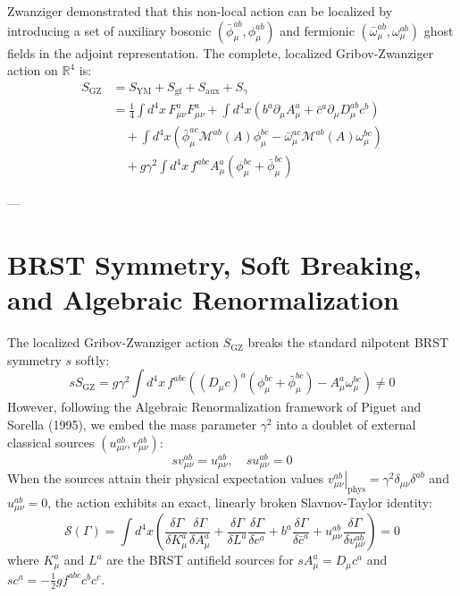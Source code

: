 \documentclass[11pt,a4paper]{article}
\theoremstyle{definition}
\begin{document}
Zwanziger demonstrated that this non-local action can be localized by introducing a set of auxiliary bosonic $(\bar{\phi}_\mu^{ab}, \phi_\mu^{ab})$ and fermionic $(\bar{\omega}_\mu^{ab}, \omega_\mu^{ab})$ ghost fields in the adjoint representation.
The complete, localized Gribov-Zwanziger action on $\mathbb{R}^4$ is:
\begin{align}
S_{\mathrm{GZ}} &= S_{\mathrm{YM}} + S_{\mathrm{gf}} + S_{\mathrm{aux}} + S_{\gamma} \nonumber \\
&= \frac{1}{4} \int d^4x \, F_{\mu\nu}^a F_{\mu\nu}^a + \int d^4x \left( b^a \partial_\mu A_\mu^a + \bar{c}^a \partial_\mu D_\mu^{ab} c^b \right) \nonumber \\
&\quad + \int d^4x \left( \bar{\phi}_\mu^{ac} \mathcal{M}^{ab}(A) \phi_\mu^{bc} - \bar{\omega}_\mu^{ac} \mathcal{M}^{ab}(A) \omega_\mu^{bc} \right) \nonumber \\
&\quad + g \gamma^2 \int d^4x \, f^{abc} A_\mu^a (\phi_\mu^{bc} + \bar{\phi}_\mu^{bc})
\end{align}

---

\section{BRST Symmetry, Soft Breaking, and Algebraic Renormalization}
The localized Gribov-Zwanziger action $S_{\mathrm{GZ}}$ breaks the standard nilpotent BRST symmetry $s$ softly:
\begin{equation}
s S_{\mathrm{GZ}} = g \gamma^2 \int d^4x \, f^{abc} \left( (D_\mu c)^a (\phi_\mu^{bc} + \bar{\phi}_\mu^{bc}) - A_\mu^a \omega_\mu^{bc} \right) \neq 0
\end{equation}
However, following the Algebraic Renormalization framework of Piguet and Sorella (1995), we embed the mass parameter $\gamma^2$ into a doublet of external classical sources $(u_{\mu\nu}^{ab}, v_{\mu\nu}^{ab})$:
\begin{equation}
s v_{\mu\nu}^{ab} = u_{\mu\nu}^{ab}, \quad s u_{\mu\nu}^{ab} = 0
\end{equation}
When the sources attain their physical expectation values $\left. v_{\mu\nu}^{ab} \right|_{\mathrm{phys}} = \gamma^2 \delta_{\mu\nu} \delta^{ab}$ and $u_{\mu\nu}^{ab} = 0$, the action exhibits an exact, linearly broken Slavnov-Taylor identity:
\begin{equation}
\mathcal{S}(\Gamma) = \int d^4x \left( \frac{\delta \Gamma}{\delta K_\mu^a} \frac{\delta \Gamma}{\delta A_\mu^a} + \frac{\delta \Gamma}{\delta L^a} \frac{\delta \Gamma}{\delta c^a} + b^a \frac{\delta \Gamma}{\delta \bar{c}^a} + u_{\mu\nu}^{ab} \frac{\delta \Gamma}{\delta v_{\mu\nu}^{ab}} \right) = 0
\end{equation}
where $K_\mu^a$ and $L^a$ are the BRST antifield sources for $s A_\mu^a = D_\mu c^a$ and $s c^a = -\frac{1}{2} g f^{abc} c^b c^c$.
\end{document}
